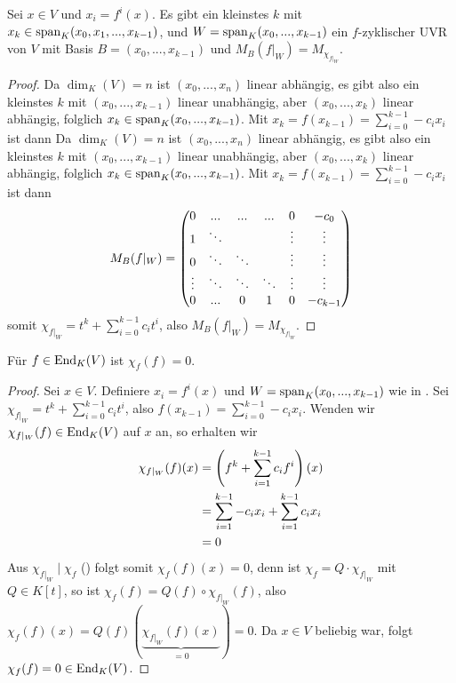 \begin{lemma}
	Sei $x\in V$ und $x_i=f^i(x)$. Es gibt ein kleinstes $k$ mit $x_k\in\operatorname{span}_K(x_0,x_1,...,x_{k-1})$, und $W=\operatorname{span}_K(x_0,...,x_{k-1})$ ein $f$-zyklischer UVR von $V$ mit Basis $B=(x_0,...,x_{k-1})$ und $M_B(f\vert_W)=M_{\chi_{f\vert_W}}$.
\end{lemma}
\begin{proof}
	Da $\dim_K(V)=n$ ist $(x_0,...,x_n)$ linear abhängig, es gibt also ein kleinstes $k$ mit $(x_0,...,x_{k-1})$ linear unabhängig, aber $(x_0,...,x_k)$ linear abhängig, folglich $x_k\in\operatorname{span}_K(x_0,...,x_{k-1})$. Mit $x_k=f(x_{k-1})=\sum_{i=0}^{k-1}-c_ix_i$ ist dann 
	Da $\dim_K(V)=n$ ist $(x_0,...,x_n)$ linear abhängig, es gibt also ein kleinstes $k$ mit $(x_0,...,x_{k-1})$ linear unabhängig, aber $(x_0,...,x_k)$ linear abhängig, folglich $x_k\in\operatorname{span}_K(x_0,...,x_{k-1})$. Mit $x_k=f(x_{k-1})=\sum_{i=0}^{k-1}-c_ix_i$ ist dann 
	\begin{align}
		M_B(f\vert_W)=\begin{pmatrix}0&...&...&...&0&-c_0\\
		1&\ddots&\;&\;&\vdots&\vdots\\
		0&\ddots&\ddots&\;&\vdots&\vdots\\
		\vdots&\ddots&\ddots&\ddots&\vdots&\vdots\\
		0&...&0&1&0&-c_{k-1}\end{pmatrix}\notag
	\end{align}
	somit $\chi_{f\vert_W}=t^k+\sum_{i=0}^{k-1}c_it^i$, also $M_B(f\vert_W)=M_{\chi_{f\vert_W}}$.
\end{proof}

\begin{theorem}
	Für $f\in\operatorname{End}_K(V)$ ist $\chi_f(f)=0$.
\end{theorem}
\begin{proof}
	Sei $x\in V$. Definiere $x_i=f^i(x)$ und $W=\operatorname{span}_K(x_0,...,x_{k-1})$ wie in . Sei $\chi_{f\vert_W}=t^k+\sum_{i=0}^{k-1} c_it^i$, also $f(x_{k-1})=\sum_{i=0}^{k-1} -c_ix_i$. Wenden wir $\chi_{f\vert_W}(f)\in\operatorname{End}_K(V)$ auf $x$ an, so erhalten wir 
	\begin{align}
		\chi_{f\vert_W}(f)(x)&=\left( f^k+\sum\limits_{i=1}^{k-1} c_if^i\right)(x)\notag \\
		&= \sum\limits_{i=1}^{k-1} -c_ix_i+\sum\limits_{i=1}^{k-1}c_ix_i\notag \\
		&= 0\notag
	\end{align}
	Aus $\chi_{f\vert_W}\mid \chi_f$ () folgt somit $\chi_f(f)(x)=0$, denn ist $\chi_f=Q\cdot \chi_{f\vert_W}$ mit $Q\in K[t]$, so ist $\chi_f(f)=Q(f)\circ\chi_{f\vert_W}(f)$, also $\chi_f(f)(x)=Q(f)(\underbrace{\chi_{f\vert_W}(f)(x)}_{=0})=0$. Da $x\in V$ beliebig war, folgt $\chi_f(f)=0\in\operatorname{End}_K(V)$.
\end{proof}

